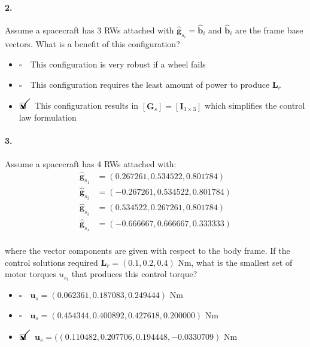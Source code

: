 \documentclass[12pt, a4paper]{article}
\newcommand{\ans}{\item[]$\rlap{\LARGE{\checkmark}}\square\quad$}
\newcommand{\noans}{\item[]$\square\quad$}
\begin{document}
\paragraph{2.}
Assume a spacecraft has 3 RWs attached with $\hat{\bm{g}}_{s_{i}} = \hat{\bm{b}}_{i}$ and $\hat{\bm{b}}_{i}$ are the frame base vectors. What is a benefit of this configuration?

\begin{itemize}
    \noans This configuration is very robust if a wheel fails
    \noans This configuration requires the least amount of power to produce $\bm{L}_{r}$
    \ans This configuration results in $[\bm{G}_{s}]=[\bm{I}_{3\times3}]$ which simplifies the control law formulation
\end{itemize}

\paragraph{3.}
Assume a spacecraft has 4 RWs attached with:
\begin{equation}
\begin{split}
\hat{\bm{g}}_{s_{1}} &= (0.267261,0.534522,0.801784) \\
\hat{\bm{g}}_{s_{2}} &= (-0.267261,0.534522,0.801784) \\
\hat{\bm{g}}_{s_{3}} &= (0.534522,0.267261,0.801784) \\
\hat{\bm{g}}_{s_{4}} &= (-0.666667,0.666667,0.333333) \\
\end{split}
\end{equation}

where the vector components are given with respect to the body frame.  If the control solutions required $ \bm{L}_{r} = (0.1, 0.2, 0.4)$ Nm, what is the smallest set of motor torques $u_{s_{i}}$ that produces this control torque?

\begin{itemize}
\noans $\bm{u}_{s} = (0.062361,0.187083,0.249444)$ Nm
\noans $\bm{u}_{s} = (0.454344,0.400892,0.427618,0.200000)$ Nm
\ans $\bm{u}_{s} = ((0.110482,0.207706,0.194448,-0.0330709)$ Nm
\end{itemize}
\end{document}

